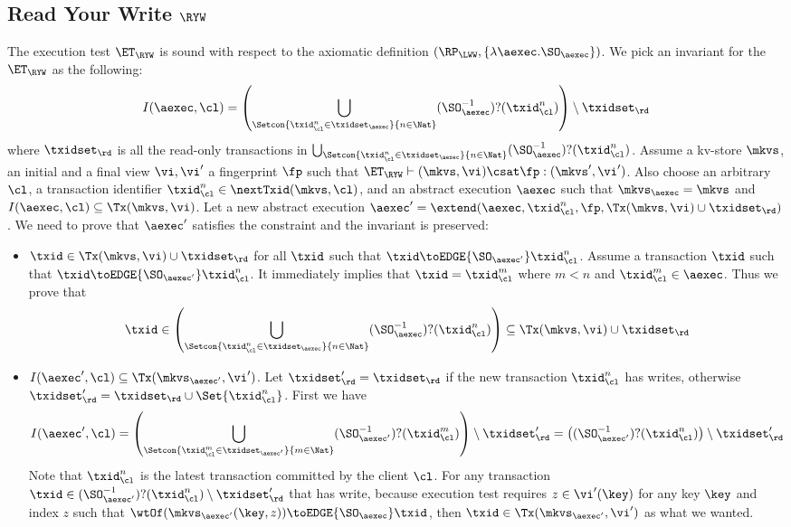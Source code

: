 \subsection{Read Your Write \( \RYW \) }

\label{sec:sound-complete-ryw}

The execution test $\ET_\RYW$ is sound with respect to the axiomatic definition 
$(\RP_{\LWW}, \{\lambda \aexec. \SO_{\aexec} \})$.
We pick an invariant for the \( \ET_\RYW \) as the following:
\[
    I(\aexec, \cl) = \left( \bigcup_{\Setcon{\txid_{\cl}^{n} \in \txidset_{\aexec} }{ n \in \Nat }} (\SO_{\aexec}^{-1})?(\txid^n_\cl) \right) \setminus \txidset_\rd
\]
where \( \txidset_\rd \) is all the read-only transactions in \( \bigcup_{\Setcon{\txid_{\cl}^{n} \in \txidset_{\aexec} }{ n \in \Nat }} (\SO_{\aexec}^{-1})?(\txid^n_\cl) \).
Assume a kv-store $\mkvs$, an initial and a final view $\vi, \vi'$  a fingerprint $\fp$ 
such that $\ET_{\RYW} \vdash (\mkvs, \vi) \csat \fp: (\mkvs',\vi')$. 
Also choose an arbitrary $\cl$, a transaction identifier $\txid_\cl^n \in \nextTxid(\mkvs, \cl)$, 
and an abstract execution $\aexec$ such that $\mkvs_{\aexec} = \mkvs$ and 
\( I(\aexec, \cl) \subseteq \Tx(\mkvs, \vi) \).
Let a new abstract execution \( \aexec' = \extend(\aexec, \txid_\cl^n, \fp, \Tx(\mkvs, \vi) \cup \txidset_\rd) \).
We need to prove that \( \aexec' \) satisfies the constraint and the invariant is preserved:
\begin{itemize}
    \item \( \txid \in \Tx(\mkvs, \vi) \cup \txidset_\rd  \) for all \( \txid \) such that \( \txid \toEDGE{\SO_{\aexec'}} \txid_\cl^n  \). 
    Assume a transaction \( \txid \) such that \( \txid \toEDGE{\SO_{\aexec'}} \txid_\cl^n \).
It immediately implies that \( \txid = \txid_\cl^m\) where \( m < n \) and \( \txid_\cl^m \in \aexec \).
Thus we prove that 
\[ 
    \txid \in \left( \bigcup_{\Setcon{\txid_{\cl}^{n} \in \txidset_{\aexec} }{ n \in \Nat}} (\SO_{\aexec}^{-1})?(\txid^n_\cl) \right) \subseteq \Tx(\mkvs,\vi) \cup \txidset_\rd
\]
\item \(I(\aexec',\cl) \subseteq \Tx(\mkvs_{\aexec'}, \vi') \).
Let \( \txidset'_\rd = \txidset_\rd \) if the new transaction \( \txid_\cl^n\) has writes, otherwise \( \txidset'_\rd = \txidset_\rd \cup \Set{\txid_\cl^n}\).
First we have
\[ I(\aexec', \cl) = \left(\bigcup_{\Setcon{\txid_{\cl}^{m} \in \txidset_{\aexec'} }{ m \in \Nat }} (\SO_{\aexec'}^{-1})?(\txid^m_\cl) \right) \setminus \txidset'_{\rd} = \left( (\SO_{\aexec'}^{-1})?(\txid^n_\cl) \right) \setminus \txidset'_\rd 
\]
Note that \( \txid^n_\cl \) is the latest transaction committed by the client \( \cl \).
For any transaction \( \txid \in (\SO_{\aexec'}^{-1})?(\txid^n_\cl) \setminus \txidset'_\rd \) that has write,
because execution test requires \( z \in \vi'(\key) \) for any key \( \key \) and index \( z \) such that \( \wtOf( \mkvs_{\aexec'}(\key, z) ) \toEDGE{\SO_\aexec} \txid \),
then \( \txid \in \Tx(\mkvs_{\aexec'}, \vi') \) as what we wanted.
\end{itemize}

